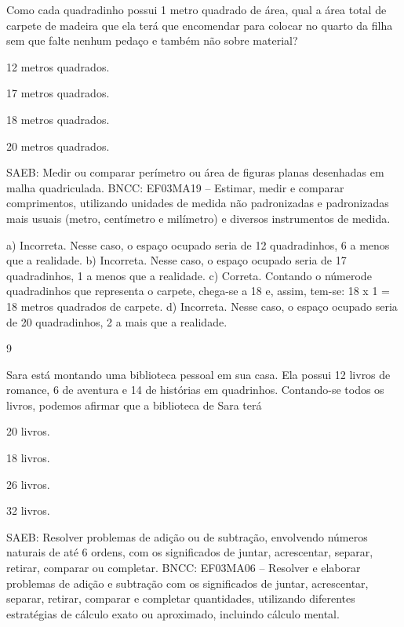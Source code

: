 \begin{multicols}{2}
{\begin{escolha}
{Como cada quadradinho possui 1 metro quadrado de área, qual a área total de carpete de madeira que ela terá que encomendar para colocar no quarto da filha sem que falte nenhum pedaço e também não sobre material?

\begin{escolha}
\item
  12 metros quadrados.
\item
  17 metros quadrados.
\item
  18 metros quadrados.
\item
  20 metros quadrados.
\end{escolha}

SAEB: Medir ou comparar perímetro ou área de figuras planas desenhadas em malha quadriculada.
BNCC: EF03MA19 -- Estimar, medir e comparar comprimentos, utilizando unidades de medida
não padronizadas e padronizadas mais usuais (metro, centímetro e milímetro) e diversos
instrumentos de medida.

a) Incorreta. Nesse caso, o espaço ocupado seria de 12 quadradinhos, 6 a menos que a realidade.
b) Incorreta. Nesse caso, o espaço ocupado seria de 17 quadradinhos, 1 a menos que a realidade.
c) Correta. Contando o númerode quadradinhos que representa o carpete, chega-se a 18 e,
assim, tem-se: 18 x 1 = 18 metros quadrados de carpete.
d) Incorreta. Nesse caso, o espaço ocupado seria de 20 quadradinhos, 2 a mais que a realidade.

\num{9}

Sara está montando uma biblioteca pessoal em sua casa. Ela possui 12 livros de romance, 6 de aventura e 14 de histórias em quadrinhos. Contando-se todos os livros, podemos afirmar que a biblioteca de Sara terá

\begin{escolha}
\item
  20 livros.
\item
  18 livros.
\item
  26 livros.
\item
  32 livros.
\end{escolha}

SAEB: Resolver problemas de adição ou de subtração,
envolvendo números naturais de até 6 ordens, com os significados de juntar, acrescentar, separar, retirar, comparar ou completar.
BNCC: EF03MA06 – Resolver e elaborar problemas de adição e subtração com os significados de
juntar, acrescentar, separar, retirar, comparar e completar quantidades, utilizando diferentes
estratégias de cálculo exato ou aproximado, incluindo cálculo mental.

}
\end{escolha}}
\end{multicols}
